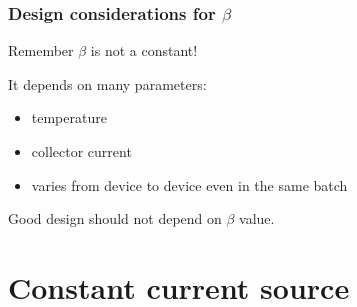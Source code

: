 \documentclass[beamer]{standalone}
\begin{document}
\begin{frame}
\frametitle{Design considerations for $\beta$}
Remember \alert{$\beta$ is not a constant!}

It depends on many parameters:
\begin{itemize}
 \item temperature
 \item collector current
 \item varies from device to device even in the same batch
\end{itemize}

Good design should not depend on $\beta$ value.
\end{frame}

\section{Constant current source} 
\end{document}
